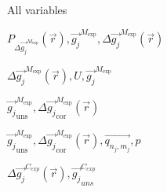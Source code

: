 \documentclass[12pt, titlepage]{article}
\begin{document}
All variables

$P_{\Delta \overrightarrow{g_{j}}^{M_{\text{exp}}}}(\vec{r}), \overrightarrow{g_{j}}^{M_{\text{exp}}}, \Delta \overrightarrow{g_{j}}^{M_{\text{exp}}}(\vec{r})$

$\Delta \overrightarrow{g_{j}}^{M_{\text{exp}}}(\vec{r}),U,\overrightarrow{g_{j}}^{M_{\text{exp}}}$

$\overrightarrow{g_{j}}_{\text{uns}}^{M_{\text{exp}}}, \Delta\overrightarrow{g_{j}}_{\text{cor}}^{M_{\text{exp}}}(\vec{r})$

$\overrightarrow{g_{j}}_{\text{uns}}^{M_{\text{exp}}},\Delta\overrightarrow{g_{j}}_{\text{cor}}^{M_{\text{exp}}}(\vec{r}),\overrightarrow{q_{n_j,m_j}},p$

$\Delta \overrightarrow{g_{j}}^{C_{exp}}(\vec{r}),\overrightarrow{g_{j}}_{uns}^{C_{exp}}$
\end{document}
